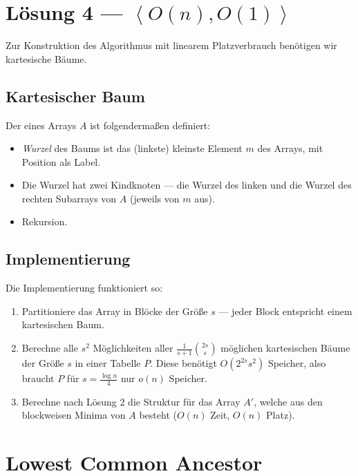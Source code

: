 \section{Lösung 4 --- \( \left\langle O(n),O(1) \right\rangle \)}

Zur Konstruktion des Algorithmus mit linearem Platzverbrauch benötigen wir kartesische Bäume.

\subsection{Kartesischer Baum}

Der  eines Arrays \( A \) ist folgendermaßen definiert:

\begin{itemize}
  \item \emph{Wurzel} des Baums ist das (linkste) kleinste Element \( m \) des Arrays, mit Position als Label.
  \item Die Wurzel hat zwei Kindknoten --- die Wurzel des linken und die Wurzel des rechten Subarrays von \( A \) (jeweils von \( m \) aus).
  \item Rekursion.
\end{itemize}

\subsection{Implementierung}

Die Implementierung funktioniert so:

\begin{enumerate}
  \item Partitioniere das Array in Blöcke der Größe \( s \) --- jeder Block entspricht einem kartesischen Baum.
  \item Berechne alle \( s^2 \) Möglichkeiten aller \( \frac{1}{s+1} \binom{2s}{s} \) möglichen kartesischen Bäume der Größe \( s \) in einer Tabelle \( P \). Diese benötigt \( O(2^{2s}s^2) \) Speicher, also braucht \( P \) für \( s = \frac{\log n}{4} \) nur \( o(n) \) Speicher.
  \item Berechne nach Lösung \( 2 \) die Struktur für das Array \( A' \), welche aus den blockweisen Minima von \( A \) besteht (\( O(n) \) Zeit, \( O(n) \) Platz).
\end{enumerate}

\section{Lowest Common Ancestor}

